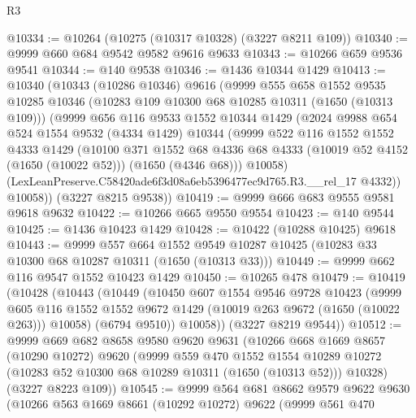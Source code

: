 \begin{lexlean}{R3}
\begin{coremodule}
@10334 := @10264 (@10275 (@10317 @10328) (@3227 @8211 @109))
@10340 := @9999 @660 @684 @9542 @9582 @9616 @9633
@10343 := @10266 @659 @9536 @9541
@10344 := @140 @9538
@10346 := @1436 @10344 @1429
@10413 := @10340
    (@10343
      (@10286 @10346)
      @9616
      (@9999
        @555
        @658
        @1552
        @9535
        @10285
        @10346
        (@10283 @109 @10300 @68 @10285 @10311 (@1650 (@10313 @109)))
        (@9999
          @656
          @116
          @9533
          @1552
          @10344
          @1429
          (@2024
            @9988
            @654
            @524
            @1554
            @9532
            (@4334 @1429)
            @10344
            (@9999
              @522
              @116
              @1552
              @1552
              @4333
              @1429
              (@10100
                @371
                @1552
                @68
                @4336
                @68
                @4333
                (@10019 @52 @4152 (@1650 (@10022 @52)))
                (@1650 (@4346 @68)))
              @10058)
            (LexLeanPreserve.C58420ade6f3d08a6eb5396477ec9d765.R3.__rel_17 @4332))
          @10058))
      (@3227 @8215 @9538))
@10419 := @9999 @666 @683 @9555 @9581 @9618 @9632
@10422 := @10266 @665 @9550 @9554
@10423 := @140 @9544
@10425 := @1436 @10423 @1429
@10428 := @10422 (@10288 @10425) @9618
@10443 := @9999
    @557
    @664
    @1552
    @9549
    @10287
    @10425
    (@10283 @33 @10300 @68 @10287 @10311 (@1650 (@10313 @33)))
@10449 := @9999 @662 @116 @9547 @1552 @10423 @1429
@10450 := @10265 @478
@10479 := @10419
    (@10428
      (@10443
        (@10449
          (@10450
            @607
            @1554
            @9546
            @9728
            @10423
            (@9999
              @605
              @116
              @1552
              @1552
              @9672
              @1429
              (@10019 @263 @9672 (@1650 (@10022 @263)))
              @10058)
            (@6794 @9510))
          @10058))
      (@3227 @8219 @9544))
@10512 := @9999
    @669
    @682
    @8658
    @9580
    @9620
    @9631
    (@10266
      @668
      @1669
      @8657
      (@10290 @10272)
      @9620
      (@9999
        @559
        @470
        @1552
        @1554
        @10289
        @10272
        (@10283 @52 @10300 @68 @10289 @10311 (@1650 (@10313 @52)))
        @10328)
      (@3227 @8223 @109))
@10545 := @9999
    @564
    @681
    @8662
    @9579
    @9622
    @9630
    (@10266
      @563
      @1669
      @8661
      (@10292 @10272)
      @9622
      (@9999
        @561
        @470

\end{coremodule}
\end{lexlean}

